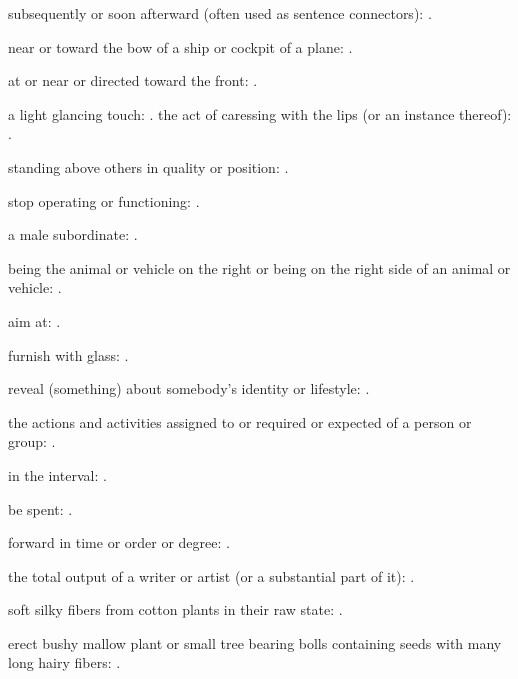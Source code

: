   subsequently or soon afterward (often used as sentence connectors):   .

  near or toward the bow of a ship or cockpit of a plane:   .

  at or near or directed toward the front: .

  a light glancing touch: . the act of caressing with the lips (or an instance thereof):   .

  standing above others in quality or position:   .

  stop operating or functioning:   .

  a male subordinate: .

  being the animal or vehicle on the right or being on the right side of an animal or vehicle: .

  aim at: .

  furnish with glass:   .

  reveal (something) about somebody's identity or lifestyle: .

  the actions and activities assigned to or required or expected of a person or group:   .

  in the interval:   .

  be spent: .

  forward in time or order or degree:   .

  the total output of a writer or artist (or a substantial part of it):   .

  soft silky fibers from cotton plants in their raw state:   .

  erect bushy mallow plant or small tree bearing bolls containing seeds with many long hairy fibers:   .

